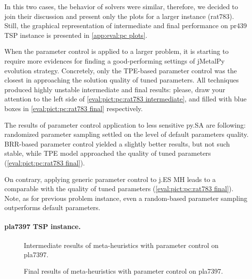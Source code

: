 In this two cases, the behavior of solvers were similar, therefore, we decided to join their discussion and present only the plots for a larger instance (rat783). Still, the graphical representation of intermediate and final performance on pr439 TSP instance is presented in \cref{app:eval:pc plots}.

When the parameter control is applied to a larger problem, it is starting to require more evidences for finding a good-performing settings of jMetalPy evolution strategy. Concretely, only the TPE-based parameter control was the closest in approaching the solution quality of tuned parameters. All techniques produced highly unstable intermediate and final results: please, draw your attention to the left side of \cref{eval:pict:pc:rat783 intermediate}, and filled with blue boxes in \cref{eval:pict:pc:rat783 final} respectively.

The results of parameter control application to less sensitive py.SA are following: randomized parameter sampling settled on the level of default parameters quality. BRR-based parameter control yielded a slightly better results, but not such stable, while TPE model approached the quality of tuned parameters (\cref{eval:pict:pc:rat783 final}).

On contrary, applying generic parameter control to j.ES MH leads to a comparable with the quality of tuned parameters (\cref{eval:pict:pc:rat783 final}). Note, as for previous problem instance, even a random-based parameter sampling outperforms default parameters.

\paragraph{pla7397 TSP instance.}
\begin{figure}[t]
	\centering
	\vspace{-20pt}
	
	\caption{Intermediate results of meta-heuristics with parameter control on pla7397.}
	\vspace{-5pt}
	\label{eval:pict:pc:pla7397 intermediate}
\end{figure}

\begin{figure}[b]
	\centering
	\vspace{-20pt}
	
	\caption{Final results of meta-heuristics with parameter control on pla7397.}
	\vspace{-5pt}
	\label{eval:pict:pc:pla7397 final}
\end{figure}

